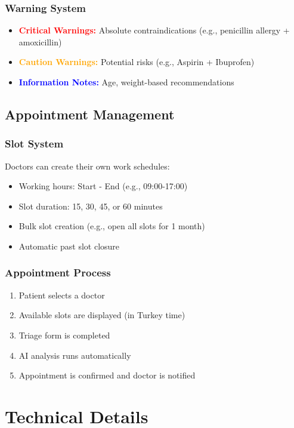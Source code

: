 \documentclass[12pt,a4paper]{article}
\begin{document}
\subsubsection{Warning System}
\begin{itemize}
    \item \textcolor{red}{\textbf{Critical Warnings:}} Absolute contraindications (e.g., penicillin allergy + amoxicillin)
    \item \textcolor{orange}{\textbf{Caution Warnings:}} Potential risks (e.g., Aspirin + Ibuprofen)
    \item \textcolor{blue}{\textbf{Information Notes:}} Age, weight-based recommendations
\end{itemize}

\subsection{Appointment Management}

\subsubsection{Slot System}
Doctors can create their own work schedules:
\begin{itemize}
    \item Working hours: Start - End (e.g., 09:00-17:00)
    \item Slot duration: 15, 30, 45, or 60 minutes
    \item Bulk slot creation (e.g., open all slots for 1 month)
    \item Automatic past slot closure
\end{itemize}

\subsubsection{Appointment Process}
\begin{enumerate}
    \item Patient selects a doctor
    \item Available slots are displayed (in Turkey time)
    \item Triage form is completed
    \item AI analysis runs automatically
    \item Appointment is confirmed and doctor is notified
\end{enumerate}

\section{Technical Details}
\end{document}
